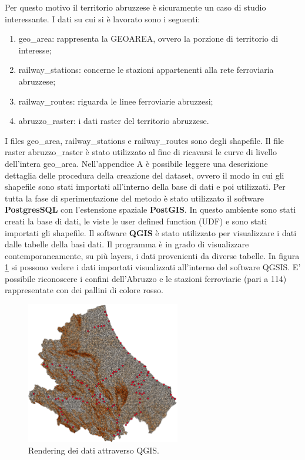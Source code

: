 Per questo motivo il territorio abruzzese è sicuramente un caso di studio interessante.
I dati su cui si è lavorato sono i seguenti:
\begin{enumerate}
	\item geo\_area: rappresenta la GEOAREA, ovvero la porzione di territorio di interesse;
	\item railway\_stations: concerne le stazioni appartenenti alla rete ferroviaria abruzzese;
	\item railway\_routes: riguarda le linee ferroviarie abruzzesi;
	\item abruzzo\_raster: i dati raster del territorio abruzzese.
\end{enumerate}
I files geo\_area, railway\_stations e railway\_routes sono degli shapefile. Il file raster abruzzo\_raster è stato utilizzato al fine di ricavarsi le curve di livello dell'intera geo\_area. Nell'appendice A è possibile leggere una descrizione dettaglia delle procedura della creazione del dataset, ovvero il modo in cui gli shapefile sono stati importati all'interno della base di dati e poi utilizzati.
Per tutta la fase di sperimentazione del metodo è stato utilizzato il software \textbf{PostgresSQL} con l’estensione spaziale \textbf{PostGIS}. In questo ambiente sono stati creati la base di dati, le viste le user defined function (UDF) e sono stati importati gli shapefile. Il software \textbf{QGIS} è stato utilizzato per visualizzare i dati dalle tabelle della basi dati. Il programma è in grado di visualizzare contemporaneamente, su più layers, i dati provenienti da diverse tabelle. In figura \ref{qgis} si possono vedere i dati importati visualizzati all'interno del software QGSIS. E' possibile riconoscere i confini dell'Abruzzo e le stazioni ferroviarie (pari a 114) rappresentate con dei pallini di colore rosso.

\begin{figure}[h]
	\centering
	\includegraphics[width=0.6\textwidth]{images/dati_abruzzo_stazione}
	\caption{Rendering dei dati attraverso QGIS.}
	\label{qgis}
\end{figure}

